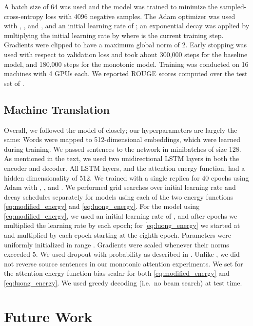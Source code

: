 \documentclass{article}
\begin{document}
A batch size of 64 was used and the model was trained to minimize the sampled- cross-entropy loss with 4096 negative samples.
The Adam optimizer  was used with , , and ,  and an initial learning rate of ; an exponential decay was applied by multiplying the initial learning rate by  where  is the current training step.
Gradients were clipped to have a maximum global norm of 2.
Early stopping was used with respect to validation loss and took about 300,000 steps for the baseline model, and 180,000 steps for the monotonic model.
Training was conducted on 16 machines with 4 GPUs each.
We reported ROUGE scores computed over the test set of .

\subsection{Machine Translation}

Overall, we followed the model of  closely; our hyperparameters are largely the same:
Words were mapped to 512-dimensional embeddings, which were learned during training.
We passed sentences to the network in minibatches of size 128.
As mentioned in the text, we used two unidirectional LSTM layers in both the encoder and decoder.
All LSTM layers, and the attention energy function, had a hidden dimensionality of 512.
We trained with a single replica for 40 epochs using Adam  with , , and .
We performed grid searches over initial learning rate and decay schedules separately for models using each of the two energy functions \cref{eq:modified_energy} and \cref{eq:luong_energy}.
For the model using \cref{eq:modified_energy}, we used an initial learning rate of , and after  epochs we multiplied the learning rate by  each epoch; for \cref{eq:luong_energy} we started at  and multiplied by  each epoch starting at the eighth epoch.
Parameters were uniformly initialized in range .
Gradients were scaled whenever their norms exceeded 5.
We used dropout with probability  as described in .
Unlike , we did not reverse source sentences in our monotonic attention experiments.
We set  for the attention energy function bias scalar for both \cref{eq:modified_energy} and \cref{eq:luong_energy}.
We used greedy decoding (i.e.\ no beam search) at test time.

\section{Future Work}
\label{sec:future_work}
\end{document}
